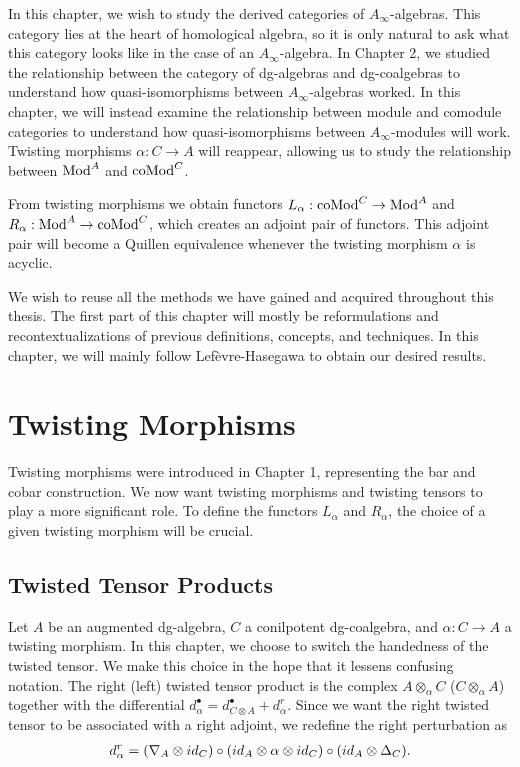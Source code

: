 \documentclass[../thesis.tex]{subfiles}
\begin{document}
    In this chapter, we wish to study the derived categories of $A_\infty$-algebras. This category lies at the heart of homological algebra, so it is only natural to ask what this category looks like in the case of an $A_\infty$-algebra. In Chapter 2, we studied the relationship between the category of dg-algebras and dg-coalgebras to understand how quasi-isomorphisms between $A_\infty$-algebras worked. In this chapter, we will instead examine the relationship between module and comodule categories to understand how quasi-isomorphisms between $A_\infty$-modules will work. Twisting morphisms $\alpha: C \rightarrow A$ will reappear, allowing us to study the relationship between $\tt{Mod}^A$ and $\tt{coMod}^C$.

    From twisting morphisms we obtain functors $L_\alpha : \tt{coMod}^C \rightarrow \tt{Mod}^A$ and $R_\alpha : \tt{Mod}^A \rightarrow \tt{coMod}^C$, which creates an adjoint pair of functors. This adjoint pair will become a Quillen equivalence whenever the twisting morphism $\alpha$ is acyclic.

    We wish to reuse all the methods we have gained and acquired throughout this thesis. The first part of this chapter will mostly be reformulations and recontextualizations of previous definitions, concepts, and techniques. In this chapter, we will mainly follow Lef\`evre-Hasegawa \cite{LefevreHasegawa03} to obtain our desired results. 

    \section{Twisting Morphisms}

        Twisting morphisms were introduced in Chapter 1, representing the bar and cobar construction. We now want twisting morphisms and twisting tensors to play a more significant role. To define the functors $L_\alpha$ and $R_\alpha$, the choice of a given twisting morphism will be crucial.  

        \subsection{Twisted Tensor Products}

            Let $A$ be an augmented dg-algebra, $C$ a conilpotent dg-coalgebra, and $\alpha: C \rightarrow A$ a twisting morphism. In this chapter, we choose to switch the handedness of the twisted tensor. We make this choice in the hope that it lessens confusing notation. The right (left) twisted tensor product is the complex $A \otimes_\alpha C$ ($C\otimes_\alpha A$) together with the differential $d_\alpha^\bullet = d_{C\otimes A}^\bullet + d_\alpha^r$. Since we want the right twisted tensor to be associated with a right adjoint, we redefine the right perturbation as
            \begin{align*}
                d_\alpha^r = (\nabla_A\otimes id_C) \circ (id_A \otimes \alpha \otimes id_C) \circ (id_A \otimes \Delta_C)\tt{.}
            \end{align*}
\end{document}
